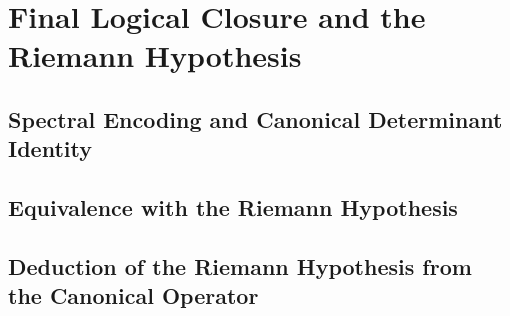 \section{Final Logical Closure and the Riemann Hypothesis}
\label{sec:logical_closure}




\subsection{Spectral Encoding and Canonical Determinant Identity}










\subsection{Equivalence with the Riemann Hypothesis}







\subsection{Deduction of the Riemann Hypothesis from the Canonical Operator}





